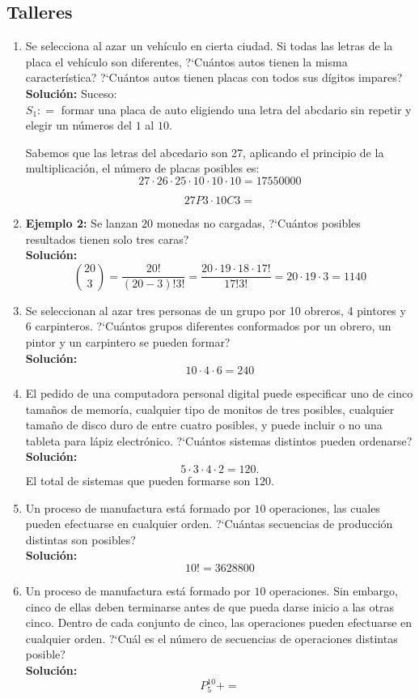 \subsection{Talleres}
\begin{enumerate}[{\rm 1.}]
    \item Se selecciona al azar un veh\'iculo en cierta ciudad. Si todas las letras de la placa el veh\'iculo son diferentes, 
    ?`Cu\'antos autos tienen la misma caracter\'istica? ?`Cu\'antos autos tienen placas con todos sus d\'igitos impares? \\
    {\bf Soluci\'on:} 
    Suceso:\\ $S_1\colon=$ formar una placa de auto eligiendo una letra del abcdario sin repetir y elegir un n\'umeros del $1$ al $10$.

    
    Sabemos que las letras del abcedario son 27, aplicando el principio de la multiplicaci\'on, el n\'umero de placas posibles es:
    $$ 27\cdot26\cdot25\cdot10\cdot10\cdot10= 17550000 $$

    $$ 27P3\cdot10C3 = $$
    \item {\bf Ejemplo 2:} Se lanzan $20$ monedas no cargadas, ?`Cu\'antos posibles resultados tienen solo tres caras?\\[5pt]
    {\bf Soluci\'on:} 
    $$\binom{20}{3} = \frac{20!}{(20-3)!3!} = \frac{20\cdot19\cdot18\cdot17!}{17!3!}=20\cdot19\cdot3=1140 $$
    \item Se seleccionan al azar tres personas de un grupo por 10
    obreros, 4 pintores y 6 carpinteros. ?`Cu\'antos grupos diferentes conformados por un obrero, un pintor y un carpintero se pueden formar?\\[5pt]
    {\rm\bf Soluci\'on: } 
    $$ 10\cdot4\cdot 6 = 240 $$
    \item El pedido de una computadora personal digital puede especificar uno de cinco tama\~nos de memor\'ia, cualquier tipo de monitos de tres posibles,
    cualquier tama\~no de disco duro de entre cuatro posibles, y puede incluir o no una tableta para l\'apiz electr\'onico. ?`Cu\'antos sistemas distintos pueden ordenarse?\\[5pt]
    {\rm\bf Soluci\'on: }
    $$ 5\cdot3\cdot4\cdot 2 = 120. $$
    El total de sistemas que pueden formarse son $120$.
    \item Un proceso de manufactura est\'a formado por $10$ operaciones, las cuales pueden efectuarse en cualquier orden. ?`Cu\'antas secuencias de producci\'on distintas son posibles?\\[5pt]
    {\rm\bf Soluci\'on: }
    $$ 10!=3628800  $$
    \item Un proceso de manufactura est\'a formado por $10$ operaciones. Sin embargo, cinco de ellas deben terminarse antes de que pueda 
    darse inicio a las otras cinco. Dentro de cada conjunto de cinco, las operaciones pueden efectuarse en cualquier orden. ?`Cu\'al es el n\'umero de secuencias de operaciones distintas posible?\\[5pt]
    {\rm\bf Soluci\'on: }
    $$ P_5^{10} +  =  $$
\end{enumerate}


